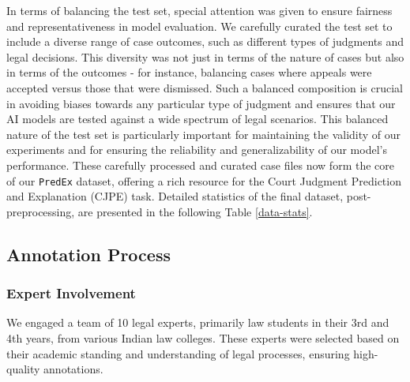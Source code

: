 In terms of balancing the test set, special attention was given to ensure fairness and representativeness in model evaluation. We carefully curated the test set to include a diverse range of case outcomes, such as different types of judgments and legal decisions. This diversity was not just in terms of the nature of cases but also in terms of the outcomes - for instance, balancing cases where appeals were accepted versus those that were dismissed. Such a balanced composition is crucial in avoiding biases towards any particular type of judgment and ensures that our AI models are tested against a wide spectrum of legal scenarios. This balanced nature of the test set is particularly important for maintaining the validity of our experiments and for ensuring the reliability and generalizability of our model's performance. These carefully processed and curated case files now form the core of our \texttt{PredEx} dataset, offering a rich resource for the Court Judgment Prediction and Explanation (CJPE) task. Detailed statistics of the final dataset, post-preprocessing, are presented in the following Table \ref{data-stats}.

\begin{table}[t]
  \centering
{}
    \caption{PredEx Statistics.}
  \label{data-stats}
\end{table}

\subsection{Annotation Process}
\subsubsection{Expert Involvement} We engaged a team of 10 legal experts, primarily law students in their 3rd and 4th years, from various Indian law colleges. These experts were selected based on their academic standing and understanding of legal processes, ensuring high-quality annotations.

